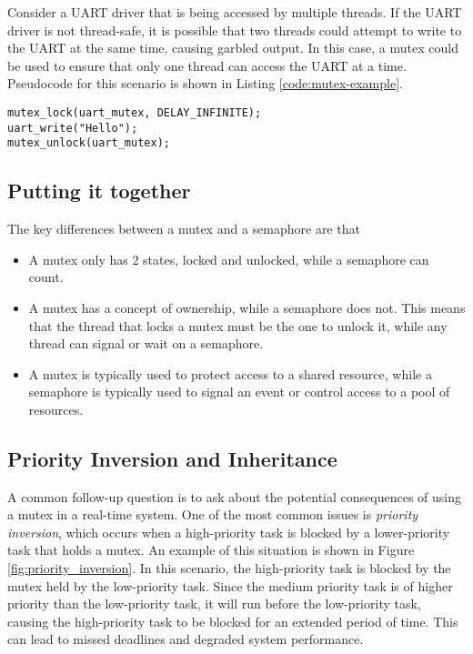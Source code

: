 \documentclass[main.tex]{subfiles}
\begin{document}
\noindent Consider a UART driver that is being accessed by multiple threads. If the UART driver is not thread-safe, it is possible that two threads could attempt to write to the UART at the same time, causing garbled output. In this case, a mutex could be used to ensure that only one thread can access the UART at a time. Pseudocode for this scenario is shown in Listing \ref{code:mutex-example}.
\begin{lstlisting}[caption={Example of Mutex Usage}, label={code:mutex-example}]
mutex_lock(uart_mutex, DELAY_INFINITE);
uart_write("Hello");
mutex_unlock(uart_mutex);
\end{lstlisting}

\subsection{Putting it together}
The key differences between a mutex and a semaphore are that
\begin{itemize}
    \item A mutex only has 2 states, locked and unlocked, while a semaphore can count.
    \item A mutex has a concept of ownership, while a semaphore does not. This means that the thread that locks a mutex must be the one to unlock it, while any thread can signal or wait on a semaphore.
    \item A mutex is typically used to protect access to a shared resource, while a semaphore is typically used to signal an event or control access to a pool of resources.
\end{itemize}

\subsection{Priority Inversion and Inheritance}
A common follow-up question is to ask about the potential consequences of using a mutex in a real-time system. One of the most common issues is \textit{priority inversion}, which occurs when a high-priority task is blocked by a lower-priority task that holds a mutex. An example of this situation is shown in Figure \ref{fig:priority_inversion}. In this scenario, the high-priority task is blocked by the mutex held by the low-priority task. Since the medium priority task is of higher priority than the low-priority task, it will run before the low-priority task, causing the high-priority task to be blocked for an extended period of time. This can lead to missed deadlines and degraded system performance.
\end{document}
